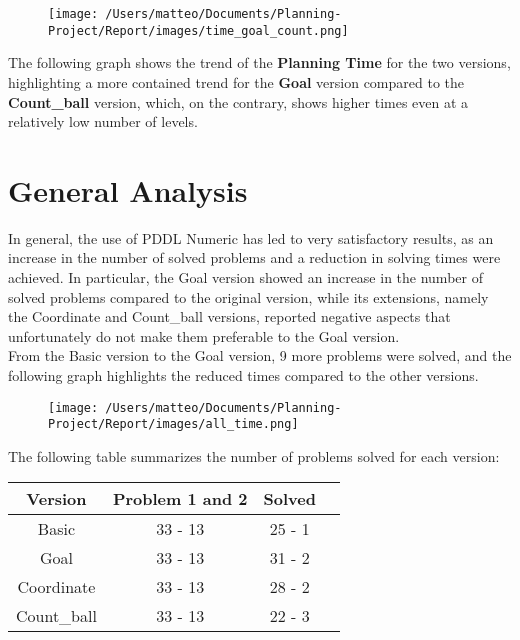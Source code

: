 \documentclass{article}
\begin{document}
\begin{figure}[H]
    \centering
    \texttt{[image: /Users/matteo/Documents/Planning-Project/Report/images/time\_goal\_count.png]}
   
 \label{fig:count_ball_states}
\end{figure}
\noindent
The following graph shows the trend of the \textbf{Planning Time} for the two versions, highlighting a more contained trend for the \textbf{Goal} version 
compared to the \textbf{Count\_ball} version, which, on the contrary, shows higher times even at a relatively low number of levels.
\section*{General Analysis}     
In general, the use of PDDL Numeric has led to very satisfactory results, as an increase in the number of solved problems and a reduction in solving times were achieved.
In particular, the Goal version showed an increase in the number of solved problems compared to the original version, while its extensions, namely the Coordinate and Count\_ball versions, reported 
negative aspects that unfortunately do not make them preferable to the Goal version.\\
From the Basic version to the Goal version, 9 more problems were solved, and the following graph highlights the reduced times compared to the other versions.
\begin{figure}[H]
    \centering
    \texttt{[image: /Users/matteo/Documents/Planning-Project/Report/images/all\_time.png]}
    \label{fig:all_versions}
\end{figure}
The following table summarizes the number of problems solved for each version:
\begin{table}[H]
    \centering
    \begin{tabular}{|c|c|c|c|}
        \hline
        \textbf{Version} & \textbf{Problem 1 and 2} & \textbf{Solved} \\
        \hline
        Basic & 33 - 13 & 25 - 1 \\
        \hline
        Goal & 33 - 
13& 31 - 2  \\
        \hline
        Coordinate & 33 - 13 & 28 - 2 \\
        \hline
        Count\_ball & 33 - 13 & 22 - 3 \\
        \hline
    \end{tabular}
\end{table}
\vspace{1cm}
\end{document}
